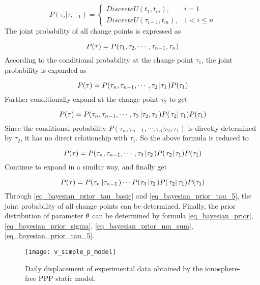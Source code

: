 \documentclass{svjour3}                     %
\begin{document}
\begin{equation}\label{eq_bayesian_prior_tau_basic}
P({\tau _i}\left| {{\tau _{i - 1}}} \right.) = \left\{ {\begin{array}{*{20}{r}}
	{DiscreteU({t_1},{t_m}),}&{i = 1}\\
	{DiscreteU({\tau _{i - 1}},{t_m}),}&{1 < i \le n}
	\end{array}} \right.
\end{equation}
The joint probability of all change points is expressed as

\begin{equation}\label{eq_bayesian_prior_tau_1}
P({\bf{\tau }}) = P({\tau _1},{\tau _2}, \cdots ,{\tau _{n - 1}},{\tau _n})
\end{equation}
According to the conditional probability at the change point ${\tau _1}$, the joint probability is expanded as

\begin{equation}\label{eq_bayesian_prior_tau_2}
P({\bf{\tau }}) = P({\tau _n},{\tau _{n - 1}}, \cdots ,{\tau _2}\left| {{\tau _1}} \right.)P({\tau _1})
\end{equation}
Further conditionally expand at the change point ${\tau _2}$ to get

\begin{equation}\label{eq_bayesian_prior_tau_3}
P({\bf{\tau }}) = P({\tau _n},{\tau _{n - 1}}, \cdots ,{\tau _3}\left| {{\tau _2},{\tau _1}} \right.)P(\left. {{\tau _2}} \right|{\tau _1})P({\tau _1})
\end{equation}
Since the conditional probability $P({\tau _n},{\tau _{n - 1}}, \cdots ,{\tau _3}\left| {{\tau _2},{\tau _1}} \right.)$ is directly determined by ${\tau _2}$, it has no direct relationship with ${\tau _1}$. So the above formula is reduced to

\begin{equation}\label{eq_bayesian_prior_tau_4}
P({\bf{\tau }}) = P({\tau _n},{\tau _{n - 1}}, \cdots ,{\tau _3}\left| {{\tau _2}} \right.)P(\left. {{\tau _2}} \right|{\tau _1})P({\tau _1})
\end{equation}
Continue to expand in a similar way, and finally get

\begin{equation}\label{eq_bayesian_prior_tau_5}
P({\bf{\tau }}) = P({\tau _n}\left| {{\tau _{n - 1}}} \right.) \cdots P({\tau _3}\left| {{\tau _2}} \right.)P(\left. {{\tau _2}} \right|{\tau _1})P({\tau _1})
\end{equation}
Through \ref{eq_bayesian_prior_tau_basic} and \ref{eq_bayesian_prior_tau_5}, the joint probability of all change points can be determined. Finally, the prior distribution of parameter ${\bf{\theta }}$ can be determined by formula \ref{eq_bayesian_prior}, \ref{eq_bayesian_prior_sigma}, \ref{eq_bayesian_prior_mu_sum}, \ref{eq_bayesian_prior_tau_5}.
\begin{figure}[H]
	\centering
	\texttt{[image: v\_simple\_p\_model]}
	\caption{Daily displacement of experimental data obtained by the ionosphere-free PPP static model.}
	\label{fig_v_simple_p_model}
\end{figure} 
\end{document}

